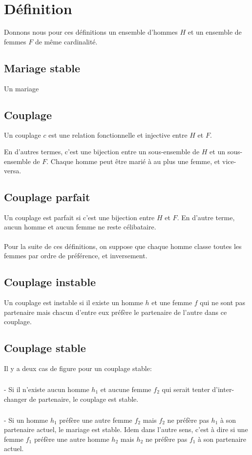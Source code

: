 \documentclass[11pt]{article}
\begin{document}
\section{Définition}

Donnons nous pour ces définitions un ensemble d'hommes $H$ et un ensemble
de femmes $F$ de même cardinalité.
\subsection{Mariage stable}
Un mariage 


\subsection{Couplage}

Un couplage $c$ est une relation fonctionnelle et injective entre $H$ et $F$.

En d’autres termes, c'est une bijection entre un sous-ensemble de $H$ et un
sous-ensemble de $F$.
Chaque homme peut être marié à au plus une femme, et vice-versa.

\subsection{Couplage parfait}
Un couplage est parfait si c’est une bijection entre $H$ et $F$.
En d'autre terme, aucun homme et aucun femme ne reste célibataire.\\\\

Pour la suite de ces définitions, on suppose que chaque homme classe toutes les femmes par ordre de
préférence, et inversement.

\subsection{Couplage instable}
Un couplage est instable si il existe un homme $h$ et une femme $f$ qui ne sont
pas partenaire mais chacun d'entre eux préfère le partenaire de l'autre dans ce
couplage. %

\subsection{Couplage stable}
Il y a deux cas de figure pour un couplage stable:
\subparagraph{}
- Si il n'existe aucun homme $h_1$ et aucune femme
$f_2$ qui serait tenter d’inter-changer de partenaire, le couplage est stable.
\subparagraph{}
- Si un homme $h_1$ préfère une autre femme $f_2$ mais $f_2$ ne préfère pas $h_1$ à son partenaire actuel, le mariage est stable. Idem dans l'autre sens, c'est à dire si une femme $f_1$ préfère une autre homme $h_2$ mais $h_2$ ne préfère pas $f_1$ à son partenaire actuel. 
\end{document}
